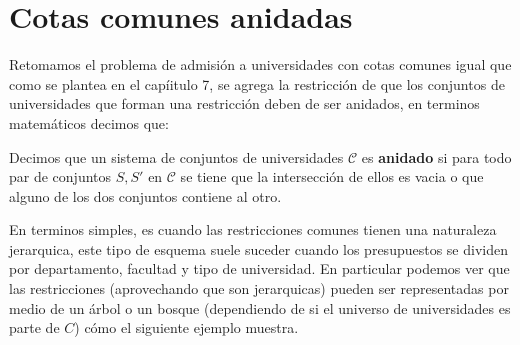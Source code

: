 \chapter{Cotas comunes anidadas}

Retomamos el problema de admisión a universidades con cotas comunes igual que como se plantea en el capíitulo 7, se agrega la restricción de que los conjuntos de universidades que forman una restricción deben de ser anidados, en terminos matemáticos decimos que:

\begin{dfn}
Decimos que un sistema de conjuntos de universidades $\mathcal{C}$ es \textbf{anidado} si para todo par de conjuntos $S,S'$ en $\mathcal{C}$ se tiene que la intersección de ellos es vacia o que alguno de los dos conjuntos contiene al otro. 
\end{dfn}

En terminos simples, es cuando las restricciones comunes tienen una naturaleza jerarquica, este tipo de esquema suele suceder cuando los presupuestos se dividen por departamento, facultad y tipo de universidad. En particular podemos ver que las restricciones (aprovechando que son jerarquicas) pueden ser representadas por medio de un árbol o un bosque (dependiendo de si el universo de universidades es parte de $C$) cómo el siguiente ejemplo muestra. 

